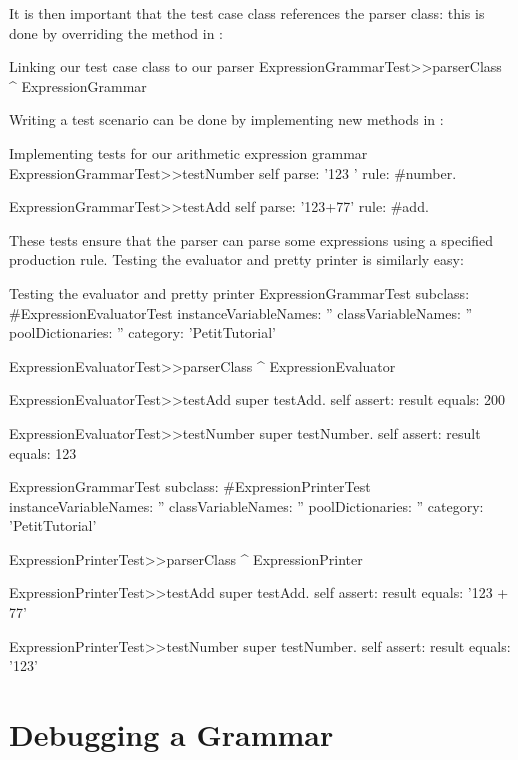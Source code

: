 \documentclass[a4paper,10pt,twoside]{book}
\begin{document}
It is then important that the test case class references the parser
class: this is done by overriding the
 method in
:

\begin{script}{Linking our test case class to our parser}
ExpressionGrammarTest>>parserClass
  ^ ExpressionGrammar
\end{script}

Writing a test scenario can be done by implementing new methods in
:

\begin{script}{Implementing tests for our arithmetic expression grammar}
ExpressionGrammarTest>>testNumber
  self parse: '123 ' rule: #number.

ExpressionGrammarTest>>testAdd
  self parse: '123+77' rule: #add.
\end{script}

These tests ensure that the  parser can parse
some expressions using a specified production rule. Testing the
evaluator and pretty printer is similarly easy:

\begin{script}{Testing the evaluator and pretty printer}
ExpressionGrammarTest subclass: #ExpressionEvaluatorTest
  instanceVariableNames: ''
  classVariableNames: ''
  poolDictionaries: ''
  category: 'PetitTutorial'

ExpressionEvaluatorTest>>parserClass
  ^ ExpressionEvaluator 

ExpressionEvaluatorTest>>testAdd
  super testAdd.
  self assert: result equals: 200

ExpressionEvaluatorTest>>testNumber
  super testNumber.
  self assert: result equals: 123

ExpressionGrammarTest subclass: #ExpressionPrinterTest
  instanceVariableNames: ''
  classVariableNames: ''
  poolDictionaries: ''
  category: 'PetitTutorial'

ExpressionPrinterTest>>parserClass
  ^ ExpressionPrinter 

ExpressionPrinterTest>>testAdd
  super testAdd.
  self assert: result equals: '123 + 77'

ExpressionPrinterTest>>testNumber
  super testNumber.
  self assert: result equals: '123'
\end{script}

\section{Debugging a Grammar}
\end{document}
